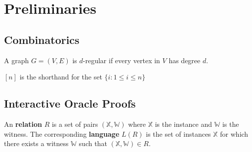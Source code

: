 \chapter{Preliminaries}

\section{Combinatorics}

\begin{definition}

A graph $G = (V, E)$ is $d$-regular if every vertex in $V$ has degree $d$.

\end{definition}

\begin{definition}[Set]

$[n]$ is the shorthand for the set $\{i: 1 \le i \le n\}$

\end{definition}

\section{Interactive Oracle Proofs}

\begin{definition}[Relation]

An \textbf{relation} $R$ is a set of pairs $(\mathbb{X}, \mathbb{W})$ where $\mathbb{X}$ is the instance and $\mathbb{W}$ is the witness. The corresponding \textbf{language} $L(R)$ is the set of instances $\mathbb{X}$ for which there exists a witness $\mathbb{W}$ such that $(\mathbb{X}, \mathbb{W}) \in R$.

\end{definition}

